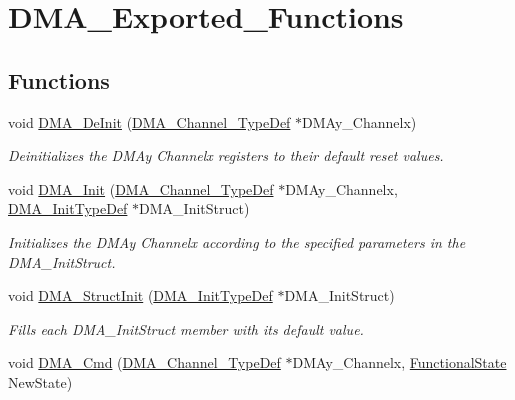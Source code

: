 \hypertarget{group___d_m_a___exported___functions}{}\section{D\+M\+A\+\_\+\+Exported\+\_\+\+Functions}
\label{group___d_m_a___exported___functions}
\subsection*{Functions}
\begin{DoxyCompactItemize}
\item 
void \mbox{\hyperlink{group___d_m_a___exported___functions_ga21ca0d50b13e502db5ab5feb484f9ece}{D\+M\+A\+\_\+\+De\+Init}} (\mbox{\hyperlink{struct_d_m_a___channel___type_def}{D\+M\+A\+\_\+\+Channel\+\_\+\+Type\+Def}} $\ast$D\+M\+Ay\+\_\+\+Channelx)
\begin{DoxyCompactList}\small\item\em Deinitializes the D\+M\+Ay Channelx registers to their default reset values. \end{DoxyCompactList}\item 
void \mbox{\hyperlink{group___d_m_a___exported___functions_ga7c3d1b9dc041f8e5f2cfc8d5dd858278}{D\+M\+A\+\_\+\+Init}} (\mbox{\hyperlink{struct_d_m_a___channel___type_def}{D\+M\+A\+\_\+\+Channel\+\_\+\+Type\+Def}} $\ast$D\+M\+Ay\+\_\+\+Channelx, \mbox{\hyperlink{struct_d_m_a___init_type_def}{D\+M\+A\+\_\+\+Init\+Type\+Def}} $\ast$D\+M\+A\+\_\+\+Init\+Struct)
\begin{DoxyCompactList}\small\item\em Initializes the D\+M\+Ay Channelx according to the specified parameters in the D\+M\+A\+\_\+\+Init\+Struct. \end{DoxyCompactList}\item 
void \mbox{\hyperlink{group___d_m_a___exported___functions_ga0f7f95f750a90a6824f4e9b6f58adc7e}{D\+M\+A\+\_\+\+Struct\+Init}} (\mbox{\hyperlink{struct_d_m_a___init_type_def}{D\+M\+A\+\_\+\+Init\+Type\+Def}} $\ast$D\+M\+A\+\_\+\+Init\+Struct)
\begin{DoxyCompactList}\small\item\em Fills each D\+M\+A\+\_\+\+Init\+Struct member with its default value. \end{DoxyCompactList}\item 
void \mbox{\hyperlink{group___d_m_a___exported___functions_ga8e7cb6b9ae5f142e2961df879cdaba65}{D\+M\+A\+\_\+\+Cmd}} (\mbox{\hyperlink{struct_d_m_a___channel___type_def}{D\+M\+A\+\_\+\+Channel\+\_\+\+Type\+Def}} $\ast$D\+M\+Ay\+\_\+\+Channelx, \mbox{\hyperlink{group___exported__types_gac9a7e9a35d2513ec15c3b537aaa4fba1}{Functional\+State}} New\+State)

\end{DoxyCompactItemize}
